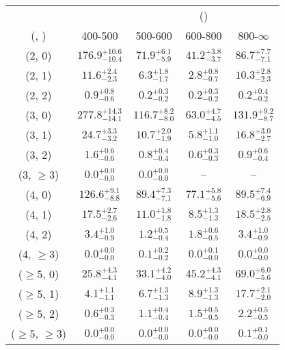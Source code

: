 \begin{table}[h!]
\tiny
\centering
{}
\begin{tabular}
{ccccc}
	\hline\hline
&	& \multicolumn{4}{c}{\scalht (\gev)} \\ 
	 (\njet,  \nb) & 400-500 & 500-600 & 600-800 & 800-$\infty$ \\ [0.8ex] 
\hline
	(2, 0) & $176.9^{+ 10.6 }_{- 10.4 }$ & $71.9^{+ 6.1 }_{- 5.9 }$ & $41.2^{+ 3.8 }_{- 3.7 }$ & $86.7^{+ 7.7 }_{- 7.1 }$ \\[0.5ex] 
	(2, 1) & $11.6^{+ 2.4 }_{- 2.3 }$ & $6.3^{+ 1.8 }_{- 1.7 }$ & $2.8^{+ 0.8 }_{- 0.7 }$ & $10.3^{+ 2.8 }_{- 2.3 }$ \\[0.5ex] 
	(2, 2) & $0.9^{+ 0.8 }_{- 0.6 }$ & $0.2^{+ 0.3 }_{- 0.2 }$ & $0.2^{+ 0.3 }_{- 0.2 }$ & $0.2^{+ 0.4 }_{- 0.2 }$ \\[0.5ex] 
	(3, 0) & $277.8^{+ 14.3 }_{- 14.1 }$ & $116.7^{+ 8.2 }_{- 8.0 }$ & $63.0^{+ 4.7 }_{- 4.5 }$ & $131.9^{+ 9.2 }_{- 8.7 }$ \\[0.5ex] 
	(3, 1) & $24.7^{+ 3.3 }_{- 3.2 }$ & $10.7^{+ 2.0 }_{- 1.9 }$ & $5.8^{+ 1.1 }_{- 1.0 }$ & $16.8^{+ 3.0 }_{- 2.7 }$ \\[0.5ex] 
	(3, 2) & $1.6^{+ 0.6 }_{- 0.6 }$ & $0.8^{+ 0.4 }_{- 0.4 }$ & $0.6^{+ 0.3 }_{- 0.3 }$ & $0.9^{+ 0.6 }_{- 0.4 }$ \\[0.5ex] 
	(3, $\ge3$) & $0.0^{+ 0.0 }_{- 0.0 }$ & $0.0^{+ 0.0 }_{- 0.0 }$ & -- & -- \\[0.5ex] 
	(4, 0) & $126.6^{+ 9.1 }_{- 8.8 }$ & $89.4^{+ 7.3 }_{- 7.1 }$ & $77.1^{+ 5.8 }_{- 5.6 }$ & $89.5^{+ 7.4 }_{- 6.9 }$ \\[0.5ex] 
	(4, 1) & $17.5^{+ 2.7 }_{- 2.6 }$ & $11.0^{+ 1.8 }_{- 1.8 }$ & $8.5^{+ 1.3 }_{- 1.3 }$ & $18.5^{+ 2.8 }_{- 2.5 }$ \\[0.5ex] 
	(4, 2) & $3.4^{+ 1.0 }_{- 0.9 }$ & $1.2^{+ 0.5 }_{- 0.4 }$ & $1.8^{+ 0.6 }_{- 0.5 }$ & $3.4^{+ 1.0 }_{- 0.9 }$ \\[0.5ex] 
	(4, $\ge3$) & $0.0^{+ 0.0 }_{- 0.0 }$ & $0.1^{+ 0.2 }_{- 0.2 }$ & $0.0^{+ 0.1 }_{- 0.0 }$ & $0.0^{+ 0.0 }_{- 0.0 }$ \\[0.5ex] 
	($\ge5$, 0) & $25.8^{+ 4.3 }_{- 4.1 }$ & $33.1^{+ 4.2 }_{- 4.0 }$ & $45.2^{+ 4.3 }_{- 4.1 }$ & $69.0^{+ 6.0 }_{- 5.6 }$ \\[0.5ex] 
	($\ge5$, 1) & $4.1^{+ 1.1 }_{- 1.1 }$ & $6.7^{+ 1.3 }_{- 1.3 }$ & $8.9^{+ 1.3 }_{- 1.3 }$ & $17.7^{+ 2.1 }_{- 2.0 }$ \\[0.5ex] 
	($\ge5$, 2) & $0.6^{+ 0.3 }_{- 0.3 }$ & $1.1^{+ 0.4 }_{- 0.4 }$ & $1.5^{+ 0.5 }_{- 0.5 }$ & $2.2^{+ 0.5 }_{- 0.5 }$ \\[0.5ex] 
	($\ge5$, $\ge3$) & $0.0^{+ 0.0 }_{- 0.0 }$ & $0.0^{+ 0.0 }_{- 0.0 }$ & $0.0^{+ 0.0 }_{- 0.0 }$ & $0.1^{+ 0.1 }_{- 0.0 }$ \\[0.5ex] 
	\hline
	\hline
\end{tabular}
\end{table}
